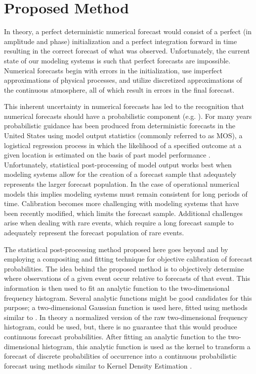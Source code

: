 

\chapter{Proposed Method}
\label{method}

In theory, a perfect deterministic numerical forecast would consist of a perfect (in amplitude and phase) initialization and a perfect integration forward in time resulting in the correct forecast of what was observed.
Unfortunately, the current state of our modeling systems is such that perfect forecasts are impossible.
Numerical forecasts begin with errors in the initialization, use imperfect approximations of physical processes, and utilize discretized approximations of the continuous atmosphere, all of which result in errors in the final forecast.

This inherent uncertainty in numerical forecasts has led to the recognition that numerical forecasts should have a probabilistic component (e.g. \citealp{Glahn1972, Murphy1993, Glahn2009}).
For many years probabilistic guidance has been produced from deterministic forecasts in the United States using model output statistics (commonly referred to as MOS), a logistical regression process in which the likelihood of a specified outcome at a given location is estimated on the basis of past model performance \citep{Glahn1972}.
Unfortunately, statistical post-processing of model output works best when modeling systems allow for the creation of a forecast sample that adequately represents the larger forecast population.
In the case of operational numerical models this implies modeling systems must remain consistent for long periods of time.
Calibration becomes more challenging with modeling systems that have been recently modified, which limits the forecast sample.
Additional challenges arise when dealing with rare events, which require a long forecast sample to adequately represent the forecast population of rare events.

The statistical post-processing method proposed here goes beyond \cite{Theis2005} and \cite{Sobash2011} by employing a compositing and fitting technique for objective calibration of forecast probabilities.
The idea behind the proposed method is to objectively determine where observations of a given event occur relative to forecasts of that event.
This information is then used to fit an analytic function to the two-dimensional frequency histogram.
Several analytic functions might be good candidates for this purpose; a two-dimensional Gaussian function is used here, fitted using methods similar to \cite{Lak2010}.
In theory a normalized version of the raw two-dimensional frequency histogram, could be used, but, there is no guarantee that this would produce continuous forecast probabilities.
After fitting an analytic function to the two-dimensional histogram, this analytic function is used as the kernel to transform a forecast of discrete probabilities of occurrence into a continuous probabilistic forecast using methods similar to Kernel Density Estimation \citep{Silverman1986}.




